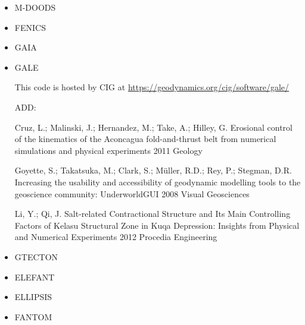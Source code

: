 \begin{itemize}
\item M-DOODS
\cite{yatd12}
\cite{yahb13}

\item FENICS
\cite{alrk14}


\item GAIA

\item GALE

This code is hosted by CIG at \url{https://geodynamics.org/cig/software/gale/}

\cite{fabs08}
\cite{beve10}
\cite{cmwt10}
\cite{lehm12}
\cite{arbi13}

ADD:


Cruz, L.; Malinski, J.; Hernandez, M.; Take, A.; Hilley, G. 	Erosional control of the kinematics of the Aconcagua fold-and-thrust belt from numerical simulations and physical experiments 	2011 	Geology

	
Goyette, S.; Takatsuka, M.; Clark, S.; Müller, R.D.; Rey, P.; Stegman, D.R. 	Increasing the usability and accessibility of geodynamic modelling tools to the geoscience community: UnderworldGUI 	2008 	Visual Geosciences
	
Li, Y.; Qi, J. 	Salt-related Contractional Structure and Its Main Controlling Factors of Kelasu Structural Zone in Kuqa Depression: Insights from Physical and Numerical Experiments 	2012 	Procedia Engineering






\item GTECTON
\cite{gowo95}
\cite{gowo99}
\cite{bugw01}
\cite{bugw02}
\cite{gowo05}
\cite{degw06}
\cite{libi06}
\cite{bagw11}
\cite{bagw11b}
\cite{mags15}




\item ELEFANT

\cite{tosn15}
\cite{matv15}
\cite{busa16}
\cite{latb17}
\cite{thie17}
\cite{pltv18}
\cite{wohu19}

\item ELLIPSIS

\cite{modm03}
\cite{omma06} 
\cite{moql07}
\cite{dyrm07}
\cite{onlg08}
\cite{pyeg10}
\cite{legu11}
\cite{lega12}


\item FANTOM

\cite{thie11}
\cite{alht11}
\cite{alht12}
\cite{alhf12}
\cite{erhv14}
\cite{thsh14}
\cite{erhv15}
\cite{erhv19}


\end{itemize}
